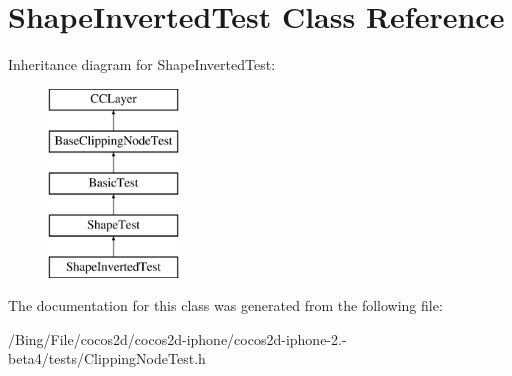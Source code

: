 \hypertarget{interface_shape_inverted_test}{\section{Shape\-Inverted\-Test Class Reference}
\label{interface_shape_inverted_test}
}
Inheritance diagram for Shape\-Inverted\-Test\-:\begin{figure}[H]
\begin{center}
\leavevmode
\includegraphics[height=5.000000cm]{interface_shape_inverted_test}
\end{center}
\end{figure}


The documentation for this class was generated from the following file\-:\begin{DoxyCompactItemize}
\item 
/\-Bing/\-File/cocos2d/cocos2d-\/iphone/cocos2d-\/iphone-\/2.-\/beta4/tests/Clipping\-Node\-Test.\-h\end{DoxyCompactItemize}
